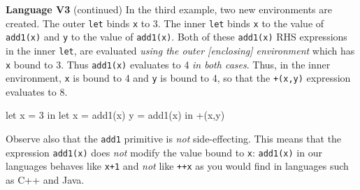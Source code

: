 \begin{minipage}[t]{\sw}
\slidenumber
\LARGE
{\bf Language V3} (continued)\exx
In the third example, two new environments are created.
The outer \verb'let' binds \verb'x' to 3.
The inner \verb'let' binds \verb'x'
to the value of \verb'add1(x)'
and \verb'y' to the value of \verb'add1(x)'.
Both of these \verb'add1(x)' RHS expressions in the inner \verb'let',
are evaluated {\em using the outer [enclosing] environment}
which has \verb'x' bound to 3.
Thus \verb'add1(x)' evaluates to 4 {\em in both cases}.
Thus, in the inner environment,
\verb'x' is bound to 4 and \verb'y' is bound to 4,
so that the \verb'+(x,y)' expression evaluates to 8.
{\Large
\begin{qv}
let x = 3
in
  let
    x = add1(x)
    y = add1(x)
  in
    +(x,y)
\end{qv}
}
Observe also that the \verb'add1' primitive is {\em not} side-effecting.
This means that the expression \verb'add1(x)'
does {\em not} modify the value bound to \verb'x':
\verb'add1(x)' in our languages
behaves like \verb'x+1' and {\em not} like \verb'++x'
as you would find in languages such as C++ and Java.
\end{minipage}
\clearpage
